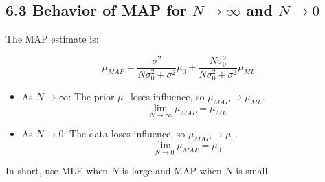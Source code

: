 \documentclass{article}
\begin{document}
\subsection*{6.3 Behavior of MAP for $N \to \infty$ and $N \to 0$}
The MAP estimate is:

\[
\mu_{MAP} = \frac{\sigma^2}{N\sigma_0^2 + \sigma^2} \mu_0 + \frac{N\sigma_0^2}{N\sigma_0^2 + \sigma^2} \mu_{ML}
\]

\begin{itemize}
    \item As $N \to \infty$: The prior $\mu_0$ loses influence, so $\mu_{MAP} \to \mu_{ML}$.
    \[
    \lim_{N \to \infty} \mu_{MAP} = \mu_{ML}
    \]
    \item As $N \to 0$: The data loses influence, so $\mu_{MAP} \to \mu_0$.
    \[
    \lim_{N \to 0} \mu_{MAP} = \mu_0
    \]
\end{itemize}

In short, use MLE when $N$ is large and MAP when $N$ is small.
\end{document}
